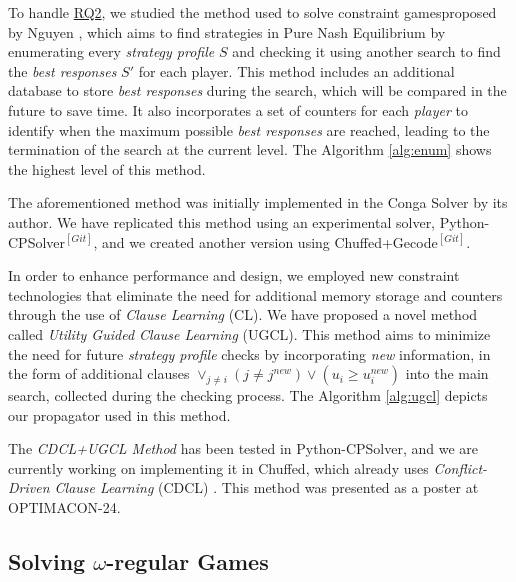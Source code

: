 \documentclass{article}
\makeatletter
\newcommand{\constraintgames}{constraint games\@ifnextchar{,}{}{\@ifnextchar{.}{}{ }}}
\newcommand{\git}[1]{\href{#1}{$^{[Git]}$}}
\makeatother
\begin{document}
To handle \hyperref[sec:rq]{RQ2}, we studied the method used to solve \constraintgames proposed by Nguyen \cite{nguyen:2015}, which aims to find strategies in Pure Nash Equilibrium by enumerating every \textit{strategy profile} $S$ and checking it using another search to find the \textit{best responses} $S'$ for each player. This method includes an additional database to store \textit{best responses} during the search, which will be compared in the future to save time. It also incorporates a set of counters for each \textit{player} to identify when the maximum possible \textit{best responses} are reached, leading to the termination of the search at the current level.  The Algorithm \ref{alg:enum} shows the highest level of this method. 

The aforementioned method was initially implemented in the Conga Solver by its author. We have replicated this method using an experimental solver, Python-CPSolver\git{https://github.com/GonzaloHernandez/python-cpsolver/blob/master/PythonCPSolver_Trail/propagators.py}, and we created another version using Chuffed+Gecode\git{https://github.com/GonzaloHernandez/equilibrium-chuffed}.

In order to enhance performance and design, we employed new constraint technologies that eliminate the need for additional memory storage and counters through the use of \textit{Clause Learning} (CL). We have proposed a novel method called \textit{Utility Guided Clause Learning} (UGCL).  This method aims to minimize the need for future \textit{strategy profile} checks by incorporating \textit{new} information, in the form of additional clauses $\vee_{j \ne i}(j \ne j^{new}) \vee (u_i \geqslant u_i^{new})$ into the main search, collected during the checking process. The Algorithm \ref{alg:ugcl} depicts our propagator used in this method.

The \textit{CDCL+UGCL Method} has been tested in Python-CPSolver, and we are currently working on implementing it in Chuffed, which already uses \textit{Conflict-Driven Clause Learning} (CDCL) \cite{stukey.2010}. This method was presented as a poster at OPTIMACON-24.

\subsection{Solving $\omega$-regular Games}\label{sec:solvingwregular}
\end{document}
